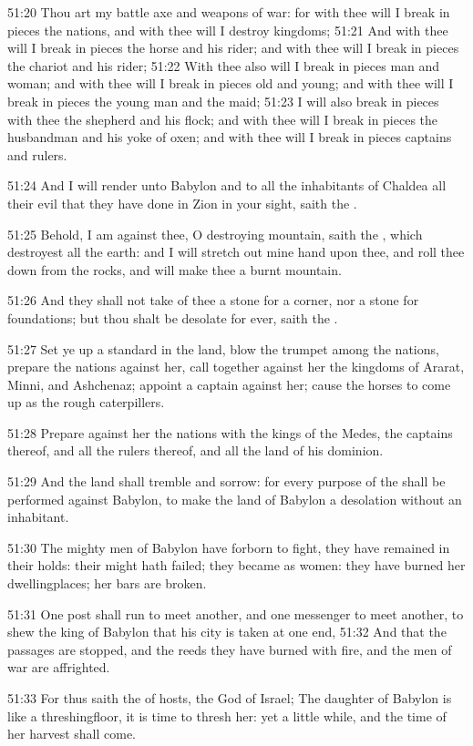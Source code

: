 51:20 Thou art my battle axe and weapons of war: for with thee will I break in pieces the nations, and with thee will I destroy kingdoms; 51:21 And with thee will I break in pieces the horse and his rider; and with thee will I break in pieces the chariot and his rider; 51:22 With thee also will I break in pieces man and woman; and with thee will I break in pieces old and young; and with thee will I break in pieces the young man and the maid; 51:23 I will also break in pieces with thee the shepherd and his flock; and with thee will I break in pieces the husbandman and his yoke of oxen; and with thee will I break in pieces captains and rulers.

51:24 And I will render unto Babylon and to all the inhabitants of Chaldea all their evil that they have done in Zion in your sight, saith the \LORD.

51:25 Behold, I am against thee, O destroying mountain, saith the \LORD, which destroyest all the earth: and I will stretch out mine hand upon thee, and roll thee down from the rocks, and will make thee a burnt mountain.

51:26 And they shall not take of thee a stone for a corner, nor a stone for foundations; but thou shalt be desolate for ever, saith the \LORD.

51:27 Set ye up a standard in the land, blow the trumpet among the nations, prepare the nations against her, call together against her the kingdoms of Ararat, Minni, and Ashchenaz; appoint a captain against her; cause the horses to come up as the rough caterpillers.

51:28 Prepare against her the nations with the kings of the Medes, the captains thereof, and all the rulers thereof, and all the land of his dominion.

51:29 And the land shall tremble and sorrow: for every purpose of the \LORD shall be performed against Babylon, to make the land of Babylon a desolation without an inhabitant.

51:30 The mighty men of Babylon have forborn to fight, they have remained in their holds: their might hath failed; they became as women: they have burned her dwellingplaces; her bars are broken.

51:31 One post shall run to meet another, and one messenger to meet another, to shew the king of Babylon that his city is taken at one end, 51:32 And that the passages are stopped, and the reeds they have burned with fire, and the men of war are affrighted.

51:33 For thus saith the \LORD of hosts, the God of Israel; The daughter of Babylon is like a threshingfloor, it is time to thresh her: yet a little while, and the time of her harvest shall come.

